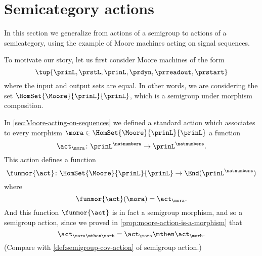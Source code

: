 
\section{Semicategory actions}
\label{sec:action-of-a-category}



In this section we generalize from actions of a semigroup to actions of a semicategory, using the example of Moore machines acting on signal sequences.

To motivate our story, let us first consider Moore machines of the form 
$$\tup{\prinL,\prstL,\prinL,\prdyn,\prreadout,\prstart}$$ 
where the input and output sets are equal. In other words, we are considering the set $\HomSet{\Moore}{\prinL}{\prinL}$, which is a semigroup under morphism composition.   

In \cref{sec:Moore-acting-on-sequences} we defined a standard action which associates to every morphism $\mora \in \HomSet{\Moore}{\prinL}{\prinL}$ a function 
\begin{equation}
\act_{\mora} \colon {\prinL}^\natnumbers \to {\prinL}^\natnumbers.
\end{equation}
This action defines a function 
\begin{equation}
\funmor{\act} \colon  \HomSet{\Moore}{\prinL}{\prinL} \to \End ({\prinL}^{\natnumbers})
\end{equation}
where 
$$
\funmor{\act}(\mora) = \act_{\mora}.
$$
And this function $\funmor{\act}$ is in fact a semigroup morphism, and so a semigroup action, since we proved in \cref{prop:moore-action-is-a-morphism} that
\begin{equation}
\act_{\mora \mthen \morb} = \act_\mora \mthen \act_\morb.
\end{equation}
(Compare with \cref{def:semigroup-cov-action} of semigroup action.)

